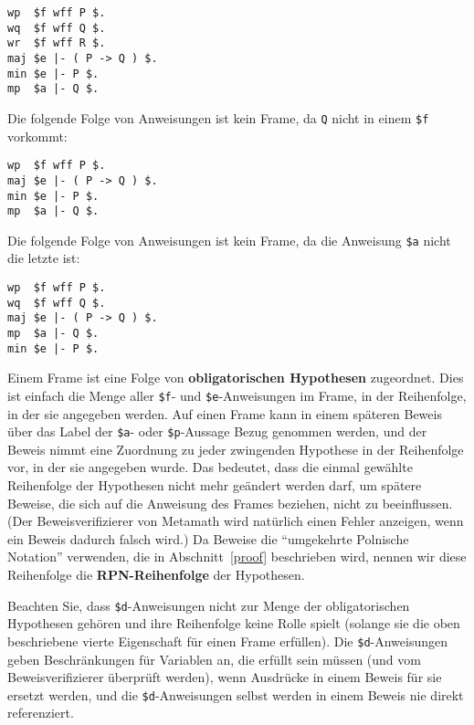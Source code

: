 \begin{verbatim}
wp  $f wff P $.
wq  $f wff Q $.
wr  $f wff R $.
maj $e |- ( P -> Q ) $.
min $e |- P $.
mp  $a |- Q $.
\end{verbatim}

Die folgende Folge von Anweisungen ist kein Frame, da \texttt{Q} nicht in einem \texttt{\$f} vorkommt:

\begin{verbatim}
wp  $f wff P $.
maj $e |- ( P -> Q ) $.
min $e |- P $.
mp  $a |- Q $.
\end{verbatim}

Die folgende Folge von Anweisungen ist kein Frame, da die Anweisung \texttt{\$a} nicht die letzte ist:

\begin{verbatim}
wp  $f wff P $.
wq  $f wff Q $.
maj $e |- ( P -> Q ) $.
mp  $a |- Q $.
min $e |- P $.
\end{verbatim}

Einem Frame ist eine Folge von {\bf obligatorischen Hypothesen} zugeordnet.  Dies ist einfach die Menge aller \texttt{\$f}- und \texttt{\$e}-Anweisungen im Frame, in der Reihenfolge, in der sie angegeben werden.  Auf einen Frame kann in einem späteren Beweis über das Label der \texttt{\$a}- oder \texttt{\$p}-Aussage Bezug genommen werden, und der Beweis nimmt eine Zuordnung zu jeder zwingenden Hypothese in der Reihenfolge vor, in der sie angegeben wurde.  Das bedeutet, dass die einmal gewählte Reihenfolge der Hypothesen nicht mehr geändert werden darf, um spätere Beweise, die sich auf die Anweisung des Frames beziehen, nicht zu beeinflussen.  (Der Beweisverifizierer von Metamath wird natürlich einen Fehler anzeigen, wenn ein Beweis dadurch falsch wird.)  Da Beweise die "`umgekehrte Polnische Notation"' verwenden, die in Abschnitt~\ref{proof} beschrieben wird, nennen wir diese Reihenfolge die {\bf RPN-Reihenfolge} der Hypothesen.

Beachten Sie, dass \texttt{\$d}-Anweisungen nicht zur Menge der obligatorischen Hypothesen gehören und ihre Reihenfolge keine Rolle spielt (solange sie die oben beschriebene vierte Eigenschaft für einen Frame erfüllen).  Die \texttt{\$d}-Anweisungen geben Beschränkungen für Variablen an, die erfüllt sein müssen (und vom Beweisverifizierer überprüft werden), wenn Ausdrücke in einem Beweis für sie ersetzt werden, und die \texttt{\$d}-Anweisungen selbst werden in einem Beweis nie direkt referenziert.

